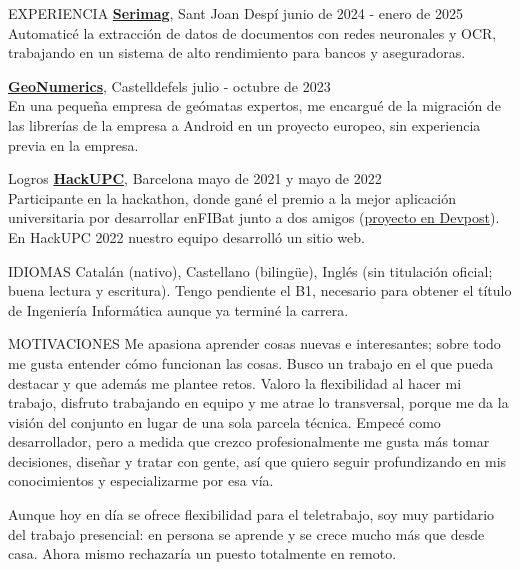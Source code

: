 \documentclass{resume} %
\begin{document}
\begin{rSection}{EXPERIENCIA}
  \textbf{\href{https://serimag.com/en/}{Serimag}}, Sant Joan Despí
  \hfill {junio de 2024 - enero de 2025} \\
  Automaticé la extracción de datos de documentos con redes neuronales y
  OCR, trabajando en un sistema de alto rendimiento para bancos y
  aseguradoras.

  \textbf{\href{https://www.geonumerics.es/}{GeoNumerics}}, Castelldefels
  \hfill {julio - octubre de 2023} \\
  En una pequeña empresa de geómatas expertos, me encargué de la
  migración de las librerías de la empresa a Android en un proyecto
  europeo, sin experiencia previa en la empresa.

\end{rSection}

\begin{rSection}{Logros}
  \textbf{\href{https://hackupc.com/}{HackUPC}}, Barcelona \hfill
  mayo de 2021 y mayo de 2022 \\
  Participante en la hackathon, donde gané el premio a la mejor
  aplicación universitaria por desarrollar enFIBat junto a dos amigos
  (\href{https://devpost.com/pololo300}{proyecto en Devpost}). En
  HackUPC 2022 nuestro equipo desarrolló un sitio web.
\end{rSection}

\begin{rSection}{IDIOMAS}
  Catalán (nativo), Castellano (bilingüe), Inglés (sin titulación
  oficial; buena lectura y escritura). Tengo pendiente el B1, necesario
  para obtener el título de Ingeniería Informática aunque ya terminé
  la carrera.
\end{rSection}

\begin{rSection}{MOTIVACIONES}
  Me apasiona aprender cosas nuevas e interesantes; sobre todo me gusta
  entender cómo funcionan las cosas. Busco un trabajo en el que pueda
  destacar y que además me plantee retos. Valoro la flexibilidad al
  hacer mi trabajo, disfruto trabajando en equipo y me atrae lo
  transversal, porque me da la visión del conjunto en lugar de una sola
  parcela técnica. Empecé como desarrollador, pero a medida que crezco
  profesionalmente me gusta más tomar decisiones, diseñar y tratar con
  gente, así que quiero seguir profundizando en mis conocimientos y
  especializarme por esa vía.

  Aunque hoy en día se ofrece flexibilidad para el teletrabajo, soy muy
  partidario del trabajo presencial: en persona se aprende y se crece
  mucho más que desde casa. Ahora mismo rechazaría un puesto totalmente
  en remoto.
\end{rSection}
\end{document}
